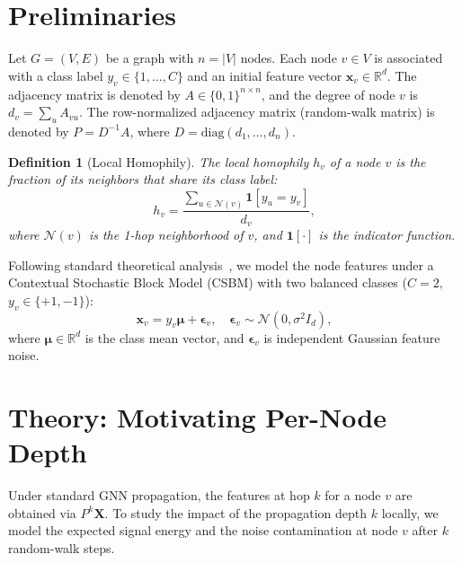 \documentclass[letterpaper]{article}
\newtheorem{definition}{Definition}
\begin{document}
\section{Preliminaries}
\label{sec:prelims}

Let $G=(V, E)$ be a graph with $n = |V|$ nodes. Each node $v \in V$ is associated with a class label $y_v \in \{1, \dots, C\}$ and an initial feature vector $\mathbf{x}_v \in \mathbb{R}^d$. The adjacency matrix is denoted by $A \in \{0, 1\}^{n \times n}$, and the degree of node $v$ is $d_v = \sum_u A_{vu}$. The row-normalized adjacency matrix (random-walk matrix) is denoted by $P = D^{-1}A$, where $D = \mathrm{diag}(d_1, \dots, d_n)$.

\begin{definition}[Local Homophily]
The local homophily $h_v$ of a node $v$ is the fraction of its neighbors that share its class label:
\begin{equation}
  h_v = \frac{\sum_{u \in \mathcal{N}(v)} \mathbf{1}[y_u = y_v]}{d_v},
\end{equation}
where $\mathcal{N}(v)$ is the 1-hop neighborhood of $v$, and $\mathbf{1}[\cdot]$ is the indicator function.
\end{definition}

Following standard theoretical analysis~\cite{baranwal2023}, we model the node features under a Contextual Stochastic Block Model (CSBM) with two balanced classes ($C=2$, $y_v \in \{+1, -1\}$):
\begin{equation}
  \mathbf{x}_v = y_v \boldsymbol\mu + \boldsymbol\epsilon_v, \quad \boldsymbol\epsilon_v \sim \mathcal{N}(0, \sigma^2 I_d),
\end{equation}
where $\boldsymbol\mu \in \mathbb{R}^d$ is the class mean vector, and $\boldsymbol\epsilon_v$ is independent Gaussian feature noise.

\section{Theory: Motivating Per-Node Depth}
\label{sec:theory}

Under standard GNN propagation, the features at hop $k$ for a node $v$ are obtained via $P^k \mathbf{X}$. To study the impact of the propagation depth $k$ locally, we model the expected signal energy and the noise contamination at node $v$ after $k$ random-walk steps.
\end{document}
